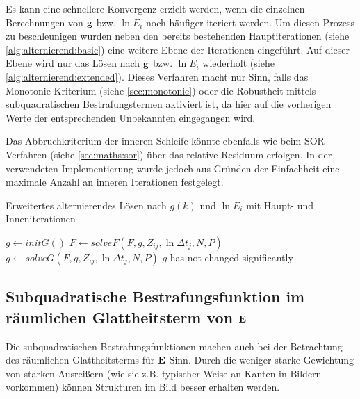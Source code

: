 Es kann eine schnellere Konvergenz erzielt werden, wenn die einzelnen Berechnungen von $\mathbf g$ bzw. $\ln E_i$ noch häufiger iteriert werden. Um diesen Prozess zu beschleunigen wurden neben den bereits bestehenden Hauptiterationen (siehe \autoref{alg:alternierend:basic}) eine weitere Ebene der Iterationen eingeführt. Auf dieser Ebene wird nur das Lösen nach $\mathbf g$ bzw. $\ln E_i$ wiederholt (siehe \autoref{alg:alternierend:extended}). Dieses Verfahren macht nur Sinn, falls das Monotonie-Kriterium (siehe \autoref{sec:monotonie}) oder die Robustheit mittels subquadratischen Bestrafungstermen aktiviert ist, da hier auf die vorherigen Werte der entsprechenden Unbekannten eingegangen wird. 

Das Abbruchkriterium der inneren Schleife könnte ebenfalls wie beim \gls{SOR}-Verfahren (siehe \autoref{sec:maths:sor}) über das relative Residuum erfolgen. In der verwendeten Implementierung wurde jedoch aus Gründen der Einfachheit eine maximale Anzahl an inneren Iterationen festgelegt.

\begin{Algorithmus} %
\caption{Erweitertes alternierendes Lösen nach $g(k)$ und $\ln E_i$ mit Haupt- und Inneniterationen}
\label{alg:alternierend:extended}
\begin{algorithmic}
	\State $g \gets initG()$
		\Repeat
		    \State $F \gets solveF(F, g, Z_{ij}, \ln \Delta t_j, N, P)$ 
		\Repeat
			\State $g \gets solveG(F, g, Z_{ij}, \ln \Delta t_j, N, P)$
		\Until$g$ has not changed significantly
	\EndWhile
	\State \Return [$g$, $F$]
\EndFunction
\end{algorithmic}
\end{Algorithmus}






\subsection{Subquadratische Bestrafungsfunktion im räumlichen Glattheitsterm von $\mathbf E$}
\label{subsec:robust:e:raum}
Die subquadratischen Bestrafungsfunktionen machen auch bei der Betrachtung des räumlichen Glattheitsterms für $\mathbf E$ 
Sinn. Durch die weniger starke Gewichtung von starken Ausreißern (wie sie z.B. typischer Weise an Kanten in Bildern vorkommen) können Strukturen im Bild besser erhalten werden.

